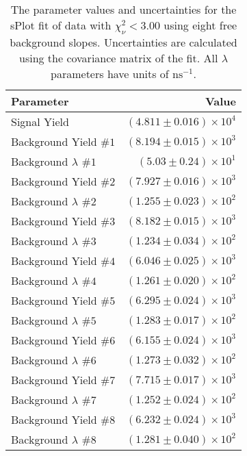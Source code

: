 
\begin{table}[h]
    \begin{center}
        \begin{tabular}{lr}\toprule
            Parameter & Value \\\midrule
            Signal Yield & $(4.811 \pm 0.016) \times 10^{4}$ \\
            Background Yield $\#1$ & $(8.194 \pm 0.015) \times 10^{3}$ \\
            Background $\lambda$ $\#1$ & $(5.03 \pm 0.24) \times 10^{1}$ \\
            Background Yield $\#2$ & $(7.927 \pm 0.016) \times 10^{3}$ \\
            Background $\lambda$ $\#2$ & $(1.255 \pm 0.023) \times 10^{2}$ \\
            Background Yield $\#3$ & $(8.182 \pm 0.015) \times 10^{3}$ \\
            Background $\lambda$ $\#3$ & $(1.234 \pm 0.034) \times 10^{2}$ \\
            Background Yield $\#4$ & $(6.046 \pm 0.025) \times 10^{3}$ \\
            Background $\lambda$ $\#4$ & $(1.261 \pm 0.020) \times 10^{2}$ \\
            Background Yield $\#5$ & $(6.295 \pm 0.024) \times 10^{3}$ \\
            Background $\lambda$ $\#5$ & $(1.283 \pm 0.017) \times 10^{2}$ \\
            Background Yield $\#6$ & $(6.155 \pm 0.024) \times 10^{3}$ \\
            Background $\lambda$ $\#6$ & $(1.273 \pm 0.032) \times 10^{2}$ \\
            Background Yield $\#7$ & $(7.715 \pm 0.017) \times 10^{3}$ \\
            Background $\lambda$ $\#7$ & $(1.252 \pm 0.024) \times 10^{2}$ \\
            Background Yield $\#8$ & $(6.232 \pm 0.024) \times 10^{3}$ \\
            Background $\lambda$ $\#8$ & $(1.281 \pm 0.040) \times 10^{2}$ \\\bottomrule
        \end{tabular}
        \caption{The parameter values and uncertainties for the sPlot fit of data with $\chi^2_\nu < 3.00$ using eight free background slopes. Uncertainties are calculated using the covariance matrix of the fit. All $\lambda$ parameters have units of $\si{\nano\second}^{-1}$.}
    \end{center}
\end{table}
